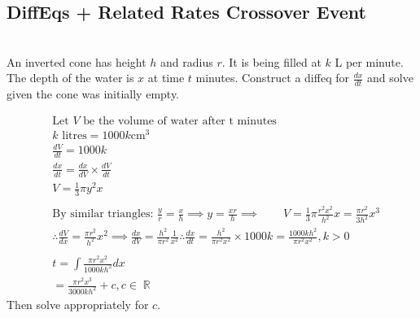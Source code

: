 \documentclass[a4paper,twoside,10pt]{article}
\DeclareMathOperator\R{\mathbb{R}}
\newenvironment{example}[1]{%
	\mbox{}\\\tcolorbox[beamer,breakable,%
		title=Example: #1,standard jigsaw,opacityback=0, colframe=blue!75!black, boxrule=2pt]}{\endtcolorbox\mbox{}\\}
\begin{document}
		\subsection{DiffEqs + Related Rates Crossover Event}
			\begin{example}{Inverted Cone}
				An inverted cone has height $h$ and radius $r$. It is being filled at $k$ L per minute. The depth of the water is $x$ at time $t$ minutes. Construct a diffeq for $\frac{dx}{dt}$ and solve given the cone was initially empty.\\
				\begin{minipage}{0.6\textwidth}
					\begin{align*}
						&\text{Let }V\text{ be the volume of water after t minutes}\\
						&k\text{ litres}=1000k\mathrm{cm}^3\\
						&\frac{dV}{dt}=1000k\\
						&\frac{dx}{dt}=\frac{dx}{dV}\times\frac{dV}{dt}\\
						&V=\frac{1}{3}\pi y^2x\\
						\\
						&\text{By similar triangles: }\frac{y}{r}=\frac{x}{h}\implies y=\frac{xr}{h}\implies\qquad V=\frac{1}{3}\pi\frac{r^2x^2}{h^2}x=\frac{\pi r^2}{3h^2}x^3\\
						&\therefore \frac{dV}{dx}=\frac{\pi r^2}{h^2}x^2\implies\frac{dx}{dV}=\frac{h^2}{\pi r^2}\frac{1}{x^2}\therefore\frac{dx}{dt}=\frac{h^2}{\pi r^2x^2}\times1000k=\frac{1000kh^2}{\pi r^2x^2},k>0\\\\
						&t=\int\frac{\pi r^2 x^2}{1000kh^2}dx\\
						&=\frac{\pi r^2x^3}{3000kh^2}+c,c\in\R
					\end{align*}
					Then solve appropriately for $c$.
				\end{minipage}
				\hfill
				\begin{minipage}{0.2\textwidth}

\end{minipage}
\end{example}
\end{document}
